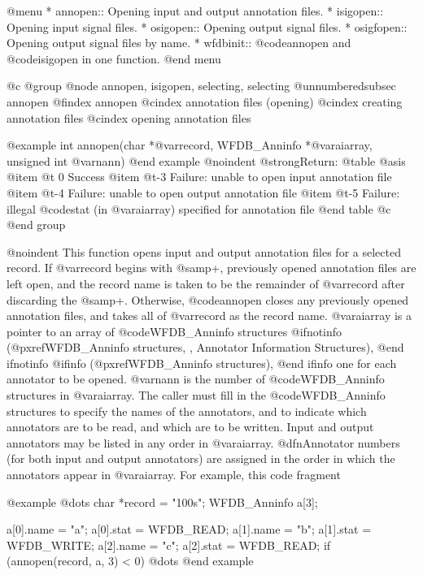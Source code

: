 {{{{{{{{@menu
* annopen::		Opening input and output annotation files.
* isigopen::		Opening input signal files.
* osigopen::		Opening output signal files.
* osigfopen::		Opening output signal files by name.
* wfdbinit::		@code{annopen} and @code{isigopen} in one function.
@end menu

@c @group
@node     annopen, isigopen, selecting, selecting
@unnumberedsubsec annopen
@findex annopen
@cindex annotation files (opening)
@cindex creating annotation files
@cindex opening annotation files

@example
int annopen(char *@var{record}, WFDB_Anninfo *@var{aiarray}, unsigned int @var{nann})
@end example
@noindent
@strong{Return:}
@table @asis
@item @t{ 0}
Success
@item @t{-3}
Failure: unable to open input annotation file
@item @t{-4}
Failure: unable to open output annotation file
@item @t{-5}
Failure: illegal @code{stat} (in @var{aiarray}) specified for annotation file
@end table
@c @end group

@noindent
This function opens input and output annotation files for a selected
record.  If @var{record} begins with @samp{+}, previously opened
annotation files are left open, and the record name is taken to be the
remainder of @var{record} after discarding the @samp{+}.  Otherwise,
@code{annopen} closes any previously opened annotation files, and takes
all of @var{record} as the record name.  @var{aiarray} is a pointer to
an array of @code{WFDB_Anninfo} structures
@ifnotinfo
(@pxref{WFDB_Anninfo structures, , Annotator Information Structures}),
@end ifnotinfo
@ifinfo
(@pxref{WFDB_Anninfo structures}),
@end ifinfo
one for each annotator to be opened.  @var{nann} is the number of
@code{WFDB_Anninfo} structures in @var{aiarray}.  The caller must
fill in the @code{WFDB_Anninfo} structures to specify the names of the
annotators, and to indicate which annotators are to be read, and which
are to be written.  Input and output annotators may be listed in any
order in @var{aiarray}.  @dfn{Annotator numbers} (for both input and
output annotators) are assigned in the order in which the annotators
appear in @var{aiarray}.  For example, this code fragment

@example
@dots{}
char *record = "100s";
WFDB_Anninfo a[3];

a[0].name = "a"; a[0].stat = WFDB_READ;
a[1].name = "b"; a[1].stat = WFDB_WRITE;
a[2].name = "c"; a[2].stat = WFDB_READ;
if (annopen(record, a, 3) < 0)
@dots{}
@end example

}}}}}}}}
